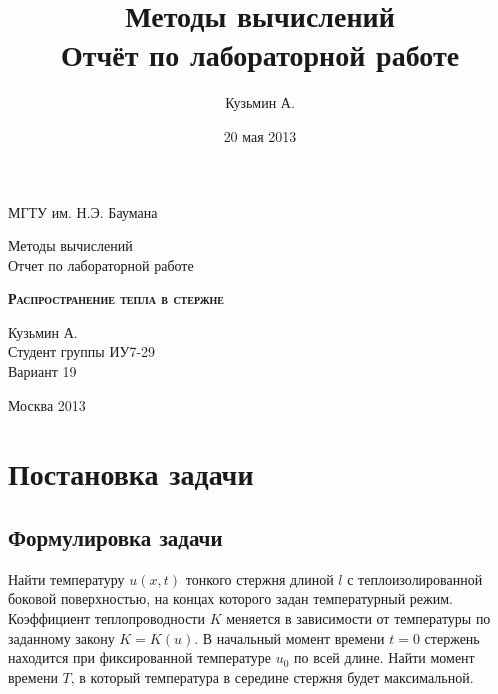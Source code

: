 \documentclass[a4paper,12pt]{article}
\title{ Методы вычислений \\Отчёт по лабораторной работе \textnumero 1 \\  }
\author{Кузьмин А.}
\date{20 мая 2013}
\begin{document}

\begin{titlepage}
\newpage
\begin{center}
МГТУ им. Н.Э. Баумана \\		%
\hrulefill %
\end{center}

\vspace{10em}
\begin{center}
\Large Методы вычислений \\
\vspace{1em}
Отчет по лабораторной работе   
\end{center}


\begin{center}
\textsc{\textbf{Распространение тепла в стержне}}
\end{center}

\vspace{15em}
\begin{flushright}
Кузьмин А. \\
Студент группы ИУ7-29 \\
Вариант 19
\end{flushright}
\vspace{\fill}
\begin{center}
Москва 2013
\end{center}
\end{titlepage}


\newpage

\section{Постановка задачи}
\subsection{Формулировка задачи}

Найти температуру $u(x,t)$ тонкого стержня длиной $l$ с теплоизолированной боковой поверхностью, на концах которого задан температурный режим. Коэффициент теплопроводности $K$ меняется в зависимости от температуры по заданному закону \( K=K(u) \). В начальный момент времени \( t=0 \) стержень находится при фиксированной температуре $u_0$ по всей длине. Найти момент времени $T$, в который температура в середине стержня будет максимальной.
\end{document}
